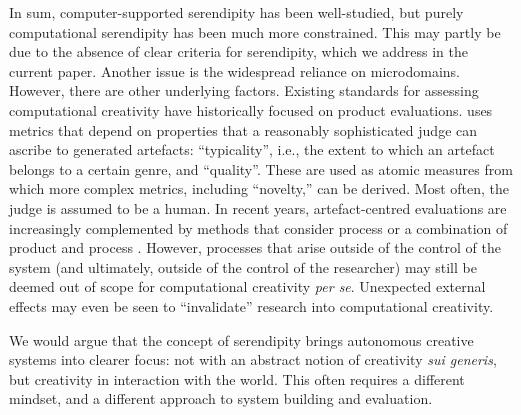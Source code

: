 In sum, computer-supported serendipity has been well-studied, but
purely computational serendipity has been much more constrained.
This may partly be
due to the absence of clear criteria for serendipity, which we address
in the current paper.  Another issue is the widespread reliance on microdomains.  However, there are other underlying factors.
Existing standards for assessing computational creativity have
historically focused on product evaluations.
 uses metrics that depend on properties that a reasonably sophisticated judge can ascribe to generated artefacts:  ``typicality'', i.e., the extent to which an artefact belongs to a certain genre, and ``quality''.  These are used as atomic measures from which more complex metrics, including ``novelty,'' can be derived.  Most often, the judge is assumed to be a human.
%
In recent years, artefact-centred evaluations are increasingly
complemented by methods that consider process
\cite{colton2008creativity} or a combination of product and process
\cite{jordanous:12,colton-assessingprogress}.  However, processes that
arise outside of the control of the system (and ultimately, outside of
the control of the researcher) may still be deemed out of scope for
computational creativity \emph{per se}.  Unexpected external effects
may even be seen to ``invalidate'' research into computational
creativity.

We would argue that the concept of serendipity brings autonomous
creative systems into clearer focus: not with an abstract notion of
creativity \emph{sui generis}, but creativity in
interaction with the world.  This often requires a different mindset,
and a different approach to system building and evaluation.


